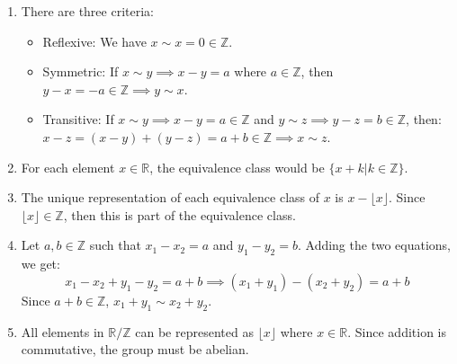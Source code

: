 \begin{sol}
    \begin{enumerate}
        \item There are three criteria:
        \begin{itemize}
            \item {Reflexive:} We have $x\sim x =0 \in \mathbb{Z}$.
            \item {Symmetric:} If $x \sim y \implies x - y = a$ where $a\in \mathbb{Z}$, then $y-x = -a \in \mathbb{Z} \implies y \sim x$.
            \item {Transitive:} If $x \sim y \implies x-y = a \in \mathbb{Z}$ and $y \sim z \implies y-z = b \in \mathbb{Z}$, then: $x-z = (x-y)+(y-z) = a+b \in \mathbb{Z} \implies x\sim z$. 
        \end{itemize}
        \item For each element $x \in \mathbb{R}$, the equivalence class would be $\{x+k | k \in \mathbb{Z}\}$.
        \item The unique representation of each equivalence class of $x$ is $x-\lfloor x \rfloor$. Since $\lfloor x \rfloor \in \mathbb{Z}$, then this is part of the equivalence class.
        \item Let $a,b \in \mathbb{Z}$ such that $x_1-x_2 = a$ and $y_1-y_2=b$. Adding the two equations, we get:
        \begin{equation}
            x_1-x_2+y_1-y_2=a+b \implies (x_1+y_1) - (x_2+y_2) = a+b
        \end{equation} 
        Since $a+b \in \mathbb{Z}$, $x_1+y_1 \sim x_2+y_2$.
        \item All elements in $\mathbb{R}/\mathbb{Z}$ can be represented as $\lfloor x \rfloor$ where $x\in \mathbb{R}$. Since addition is commutative, the group must be abelian. 
    \end{enumerate}
\end{sol}
